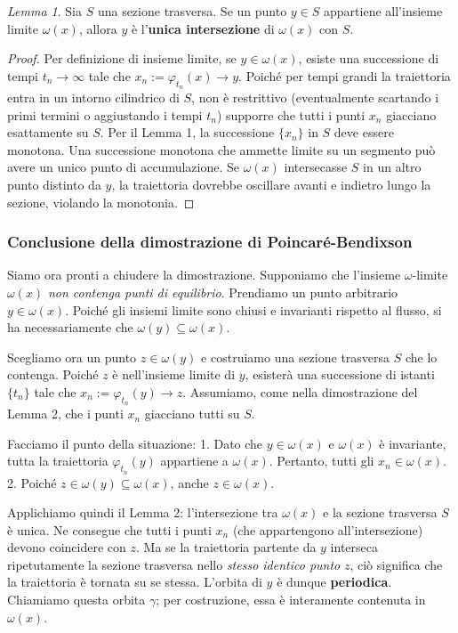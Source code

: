 \documentclass[openany]{book}
\theoremstyle{definition}
\theoremstyle{remark}
\newtheorem{lemma}{Lemma}
\begin{document}
\begin{lemma}
Sia $S$ una sezione trasversa. Se un punto $y \in S$ appartiene all'insieme limite $\omega(x)$, allora $y$ è l'\textbf{unica intersezione} di $\omega(x)$ con $S$.
\end{lemma}
\begin{proof}
Per definizione di insieme limite, se $y \in \omega(x)$, esiste una successione di tempi $t_n \to \infty$ tale che $x_n := \varphi_{t_n}(x) \to y$. Poiché per tempi grandi la traiettoria entra in un intorno cilindrico di $S$, non è restrittivo (eventualmente scartando i primi termini o aggiustando i tempi $t_n$) supporre che tutti i punti $x_n$ giacciano esattamente su $S$. 
Per il Lemma 1, la successione $\{x_n\}$ in $S$ deve essere monotona. Una successione monotona che ammette limite su un segmento può avere un unico punto di accumulazione. Se $\omega(x)$ intersecasse $S$ in un altro punto distinto da $y$, la traiettoria dovrebbe oscillare avanti e indietro lungo la sezione, violando la monotonia.
\end{proof}
 
\subsubsection*{Conclusione della dimostrazione di Poincaré-Bendixson}
Siamo ora pronti a chiudere la dimostrazione. Supponiamo che l'insieme $\omega$-limite $\omega(x)$ \textit{non contenga punti di equilibrio}. 
Prendiamo un punto arbitrario $y \in \omega(x)$. Poiché gli insiemi limite sono chiusi e invarianti rispetto al flusso, si ha necessariamente che $\omega(y) \subseteq \omega(x)$.

Scegliamo ora un punto $z \in \omega(y)$ e costruiamo una sezione trasversa $S$ che lo contenga. 
Poiché $z$ è nell'insieme limite di $y$, esisterà una successione di istanti $\{t_n\}$ tale che $x_n := \varphi_{t_n}(y) \to z$. Assumiamo, come nella dimostrazione del Lemma 2, che i punti $x_n$ giacciano tutti su $S$.

Facciamo il punto della situazione:
1. Dato che $y \in \omega(x)$ e $\omega(x)$ è invariante, tutta la traiettoria $\varphi_{t_n}(y)$ appartiene a $\omega(x)$. Pertanto, tutti gli $x_n \in \omega(x)$.
2. Poiché $z \in \omega(y) \subseteq \omega(x)$, anche $z \in \omega(x)$.

Applichiamo quindi il Lemma 2: l'intersezione tra $\omega(x)$ e la sezione trasversa $S$ è unica. Ne consegue che tutti i punti $x_n$ (che appartengono all'intersezione) devono coincidere con $z$. Ma se la traiettoria partente da $y$ interseca ripetutamente la sezione trasversa nello \textit{stesso identico punto} $z$, ciò significa che la traiettoria è tornata su se stessa. L'orbita di $y$ è dunque \textbf{periodica}. Chiamiamo questa orbita $\gamma$; per costruzione, essa è interamente contenuta in $\omega(x)$.
\end{document}
